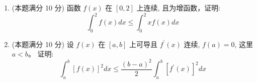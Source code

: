 \begin{enumerate}
\item 
(本题满分 10 分)
函数 $f(x)$ 在 $[0,2]$ 上连续, 且为增函数，证明:
\[
\int_{0}^{2} f(x) d x \leq \int_{0}^{2} x f(x) d x
\]


\item 
(本题满分 10 分)
设 $f(x)$ 在 $[a, b]$ 上可导且 $f^{\prime}(x)$ 连续, $f(a)=0$, 这里 $a<b$。 证明:
\[
\int_{a}^{b} \left[f(x)\right] ^{2} d x \leq \frac{(b-a)^{2}}{2} \int_{a}^{b}\left[f^{\prime}(x)\right]^{2} d x
\]
	
	
\end{enumerate}

